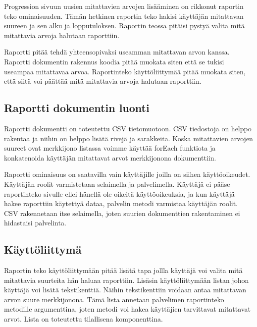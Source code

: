 


Progression sivuun uusien mitattavien arvojen lisääminen on rikkonut raportin teko ominaisuuden.
Tämän hetkinen raportin teko hakisi käyttäjän mitattavan suureen ja sen alku ja lopputuloksen.
Raportin teossa pitäisi pystyä valita mitä mitattavia arvoja halutaan raporttiin.
\medskip


Raportti pitää tehdä yhteensopivaksi useamman mitattavan arvon kanssa.
Raportti dokumentin rakennus koodia pitää muokata siten että se tukisi useampaa mitattavaa arvoa.
Raportinteko käyttöliittymää pitää muokata siten, että siitä voi päättää mitä mitattavia arvoja halutaan raporttiin.


\subsection*{Raportti dokumentin luonti}

Raportti dokumentti on toteutettu CSV tietomuotoon. 
CSV tiedostoja on helppo rakentaa ja niihin on helppo lisätä rivejä ja sarakkeita.
Koska mitattavien arvojen suureet ovat merkkijono listassa voimme käyttää forEach funktiota ja konkatenoida käyttäjän mitattavat arvot merkkijonona dokumenttiin.
\medskip


Raportti ominaisuus on saatavilla vain käyttäjille joilla on siihen käyttöoikeudet.
Käyttäjän roolit varmistetaan selaimella ja palvelimella.
Käyttäjä ei pääse raportinteko sivulle ellei hänellä ole oikeitä käyttöoikeuksia,
ja kun käyttäjä hakee raporttiin käytettyä dataa, palvelin metodi varmistaa käyttäjän roolit.
CSV rakennetaan itse selaimella, joten suurien dokumenttien rakentaminen ei hidastaisi palvelinta.




\subsection*{Käyttöliittymä}


Raportin teko käyttöliittymään pitää lisätä tapa jollla käyttäjä voi valita mitä mitattavia suurteita hän haluaa raporttiin.
Lisäsin käyttöliittymään listan johon käyttäjä voi lisätä tekstikenttiä.
Näihin tekstikenttiin voidaan antaa mitattavan arvon suure merkkijonona. 
Tämä lista annetaan palvelimen raportinteko metodille argumenttina, joten metodi voi hakea käyttäjien tarvittavat mitattavat arvot.
Lista on toteutettu tilallisena komponenttina.



